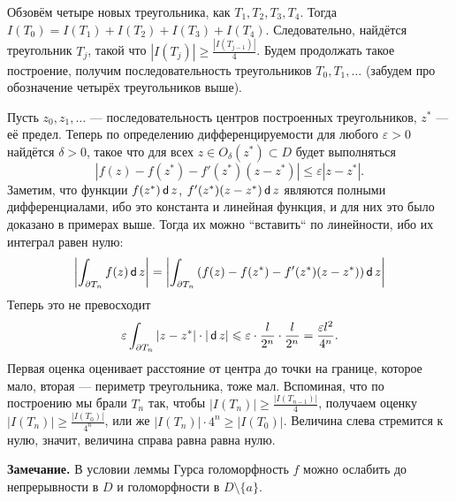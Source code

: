 Обзовём четыре новых треугольника, как $T_1, T_2, T_3, T_4$.
Тогда $I(T_0) = I(T_1) + I(T_2) + I(T_3) + I(T_4)$.
Следовательно, найдётся треугольник $T_j$, такой что $|I(T_j)| \ge \frac{|I(T_{j-1})|}{4}$.
Будем продолжать такое построение, получим последовательность треугольников $T_0, T_1, \dots$ (забудем про обозначение четырёх треугольников выше).

Пусть $z_0, z_1, \dots$ --- последовательность центров построенных треугольников, $z^*$ --- её предел.
Теперь по определению дифференцируемости для любого $\varepsilon > 0$ найдётся $\delta > 0$, такое что для всех $z \in O_\delta(z^*) \subset D$ будет выполняться
\[
    |f(z) - f(z^*) - f'(z^*)(z - z^*)| \le \varepsilon |z - z^*|.
\]
Заметим, что функции $f(z^*) \operatorname{\mathsf d} z$, $f'(z^*) (z - z^*) \operatorname{\mathsf d} z$ являются полными дифференциалами, ибо это константа и линейная функция, и для них это было доказано в примерах выше.
Тогда их можно ``вставить`` по линейности, ибо их интеграл равен нулю:
\[
    \left| \int_{\partial T_n} f(z) \operatorname{\mathsf d} z \right| = \left| \int_{\partial T_n} \left( f(z) - f(z^*) - f'(z^*) (z - z^*) \right) \operatorname{\mathsf d} z \right|
\]
Теперь это не превосходит
\[
    \varepsilon \int_{\partial T_n} |z - z^*| \cdot |\operatorname{\mathsf d} z| \leqslant \varepsilon \cdot \frac{l}{2^n} \cdot \frac{l}{2^n} = \frac{\varepsilon l^2}{4^n}.
\]
Первая оценка оценивает расстояние от центра до точки на границе, которое мало, вторая --- периметр треугольника, тоже мал.
Вспоминая, что по построению мы брали $T_n$ так, чтобы $|I(T_n)| \ge \frac{|I(T_{n-1})|}{4}$, получаем оценку $|I(T_n)| \ge \frac{|I(T_0)|}{4^n}$, или же $|I(T_n)| \cdot 4^n \ge |I(T_0)|$.
Величина слева стремится к нулю, значит, величина справа равна равна нулю.

\QED

\textbf{Замечание.} В условии леммы Гурса голоморфность $f$ можно ослабить до непрерывности в $D$ и голоморфности в $D \setminus \{a\}$.

